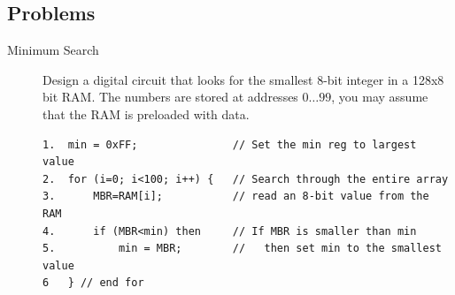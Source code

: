 \subsection{Problems}
\begin{description}


\item[Minimum Search]

Design a digital circuit that looks for the smallest 
8-bit integer in a 128x8 bit RAM.  The numbers
are stored at addresses $0\ldots 99$, you may assume that the 
RAM is preloaded with data.

\begin{verbatim}
1.  min = 0xFF;               // Set the min reg to largest value
2.  for (i=0; i<100; i++) {   // Search through the entire array
3.      MBR=RAM[i];           // read an 8-bit value from the RAM
4.      if (MBR<min) then     // If MBR is smaller than min
5.          min = MBR;        //   then set min to the smallest value
6   } // end for
\end{verbatim}





\end{description}

